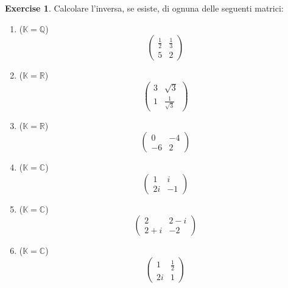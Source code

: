 \documentclass{article}
\theoremstyle{plain}
\theoremstyle{definition}
\newtheorem{xca}[exmp]{Exercise}
\theoremstyle{remark}
\begin{document}
\vspace{10pt}

\begin{bxthm}
\begin{xca}
    Calcolare l'inversa, se esiste, di ognuna delle seguenti matrici:
    \begin{multicols}{2}
    \begin{enumerate}
    \item ($\mathbb{K}=\mathbb{Q}$)
    \[
      \begin{pmatrix}
      \frac{1}{2} & \frac{1}{3} \\
      5 & 2
      \end{pmatrix}
    \]

    \item ($\mathbb{K}=\mathbb{R}$)
    \[
      \begin{pmatrix}
      3 & \sqrt{3} \\
      1 & \tfrac{1}{\sqrt{3}}
      \end{pmatrix}
    \]
  
    \item($\mathbb{K}=\mathbb{R}$)
    \[
      \begin{pmatrix}
      0 & -4 \\
      -6 & 2
      \end{pmatrix}
    \]
  
    \item ($\mathbb{K}=\mathbb{C}$)
    \[
      \begin{pmatrix}
      1 & i \\
      2i & -1
      \end{pmatrix}
    \]
  
    \item ($\mathbb{K}=\mathbb{C}$)
    \[
      \begin{pmatrix}
      2 & 2 - i \\
      2 + i & -2
      \end{pmatrix}
    \]
  
    \item ($\mathbb{K}=\mathbb{C}$)
    \[
      \begin{pmatrix}
      1 & \frac{1}{2} \\
      2i & 1
      \end{pmatrix}
    \]


\end{enumerate}
\end{multicols}
\end{xca}
\end{bxthm}
\end{document}
